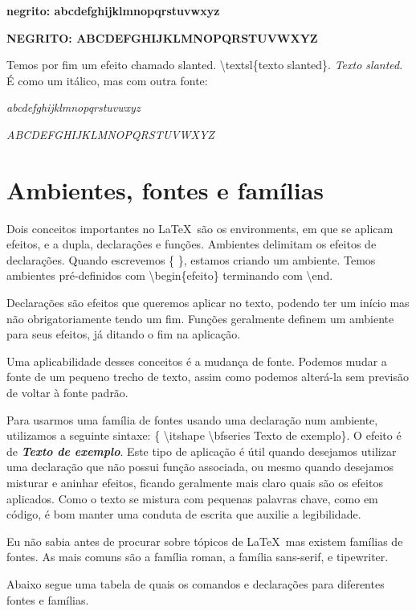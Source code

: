 \documentclass[a4paper, 12pt, oneside]{book}
\begin{document}
\textbf{negrito: abcdefghijklmnopqrstuvwxyz}

\textbf{NEGRITO: ABCDEFGHIJKLMNOPQRSTUVWXYZ}

Temos por fim um efeito chamado slanted. \textbackslash textsl\{texto slanted\}.
\textsl{Texto slanted}. É como um itálico, mas com outra fonte:

\textsl{abcdefghijklmnopqrstuvwxyz}

\textsl{ABCDEFGHIJKLMNOPQRSTUVWXYZ}


\section{Ambientes, fontes e famílias}
Dois conceitos importantes no \LaTeX\ são os environments,
em que se aplicam efeitos, e a dupla, declarações e funções.
Ambientes delimitam os efeitos de declarações.
Quando escrevemos \{ \}, estamos criando um ambiente.
Temos ambientes pré-definidos com \textbackslash begin\{efeito\} terminando com \textbackslash end.

Declarações são efeitos que queremos aplicar no texto, podendo ter um início mas não obrigatoriamente tendo um fim.
Funções geralmente definem um ambiente para seus efeitos, já ditando o fim na aplicação.

Uma aplicabilidade desses conceitos é a mudança de fonte.
Podemos mudar a fonte de um pequeno trecho de texto, assim como podemos alterá-la sem previsão de voltar à fonte padrão.

Para usarmos uma família de fontes usando uma declaração num ambiente, utilizamos a seguinte sintaxe:
\{ \textbackslash itshape \textbackslash bfseries Texto de exemplo\}.
O efeito é de {\itshape \bfseries Texto de exemplo}.
Este tipo de aplicação é útil quando desejamos utilizar uma declaração que não possui função associada,
ou mesmo quando desejamos misturar e aninhar efeitos, ficando geralmente mais claro quais são os efeitos aplicados.
Como o texto se mistura com pequenas palavras chave, como em código, é bom manter uma conduta de escrita que auxilie a legibilidade.

Eu não sabia antes de procurar sobre tópicos de \LaTeX\, mas existem famílias de fontes.
As mais comuns são a família roman, a família sans-serif, e tipewriter.

Abaixo segue uma tabela de quais os comandos e declarações para diferentes fontes e famílias.
\end{document}
